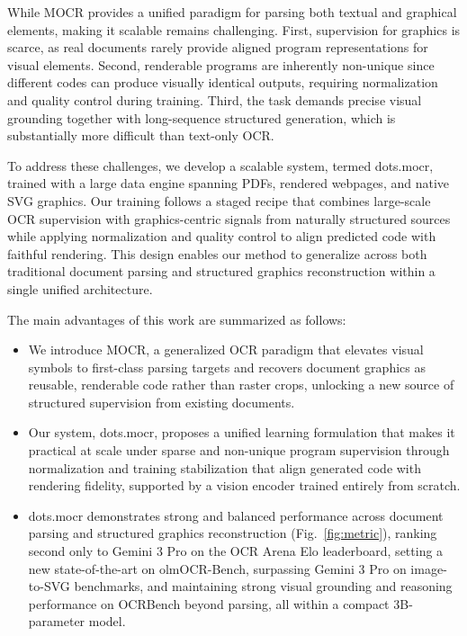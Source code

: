 \documentclass{article}
\begin{document}
While MOCR provides a unified paradigm for parsing both textual and graphical elements, making it scalable remains challenging. First, supervision for graphics is scarce, as real documents rarely provide aligned program representations for visual elements. Second, renderable programs are inherently non-unique since different codes can produce visually identical outputs, requiring normalization and quality control during training. Third, the task demands precise visual grounding together with long-sequence structured generation, which is substantially more difficult than text-only OCR.

To address these challenges, we develop a scalable system, termed dots.mocr, trained with a large data engine spanning PDFs, rendered webpages, and native SVG graphics. Our training follows a staged recipe that combines large-scale OCR supervision with graphics-centric signals from naturally structured sources while applying normalization and quality control to align predicted code with faithful rendering. This design enables our method to generalize across both traditional document parsing and structured graphics reconstruction within a single unified architecture.

The main advantages of this work are summarized as follows:

\begin{itemize}
\item We introduce MOCR, a generalized OCR paradigm that elevates visual symbols to first-class parsing targets and recovers document graphics as reusable, renderable code rather than raster crops, unlocking a new source of structured supervision from existing documents.
\item Our system, dots.mocr, proposes a unified learning formulation that makes it practical at scale under sparse and non-unique program supervision through normalization and training stabilization that align generated code with rendering fidelity, supported by a vision encoder trained entirely from scratch.
\item dots.mocr demonstrates strong and balanced performance across document parsing and structured graphics reconstruction (Fig.~\ref{fig:metric}), ranking second only to Gemini 3 Pro on the OCR Arena Elo leaderboard, setting a new state-of-the-art on olmOCR-Bench, surpassing Gemini 3 Pro on image-to-SVG benchmarks, and maintaining strong visual grounding and reasoning performance on OCRBench beyond parsing, all within a compact 3B-parameter model.
\end{itemize}
\end{document}
